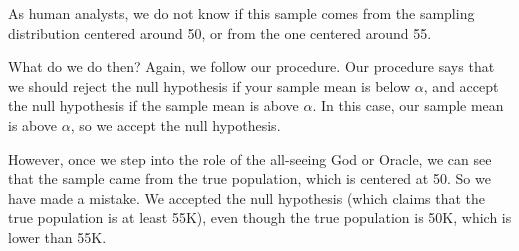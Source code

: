 \documentclass[../../../main.tex]{subfiles}
\begin{document}
\begin{center}
\end{center}

\noindent
As human analysts, we do not know if this sample comes from the sampling distribution centered around 50, or from the one centered around 55. 

What do we do then? Again, we follow our procedure. Our procedure says that we should reject the null hypothesis if your sample mean is below $\alpha$, and accept the null hypothesis if the sample mean is above $\alpha$. In this case, our sample mean is above $\alpha$, so we accept the null hypothesis.

However, once we step into the role of the all-seeing God or Oracle, we can see that the sample came from the true population, which is centered at 50. So we have made a mistake. We accepted the null hypothesis (which claims that the true population is at least 55K), even though the true population is 50K, which is lower than 55K. 
\end{document}
